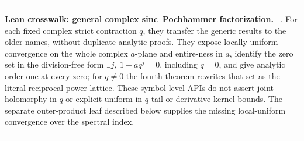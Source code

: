 \documentclass[11pt,oneside]{article}
\numberwithin{equation}{section}
\theoremstyle{definition}
\theoremstyle{remark}
\newenvironment{statusbox}[1]{%
  \par\medskip\noindent\begin{center}\begin{minipage}{0.94\textwidth}%
  \color{linkblue}\hrule\vspace{0.65em}%
  \color{black}\textbf{\color{linkblue}#1.}\ }{%
  \par\vspace{0.65em}\color{linkblue}\hrule
  \end{minipage}\end{center}\medskip}
\begin{document}
\begin{statusbox}{Lean crosswalk: general complex sinc--Pochhammer factorization}
.
For each fixed complex strict contraction $q$, they transfer the generic
 results to the older 
names, without duplicate analytic proofs.  They expose locally uniform
convergence on the whole complex $a$-plane and entire-ness in $a$, identify
the zero set in the division-free form
\(\exists j,\ 1-aq^j=0\), including \(q=0\), and give analytic order one at
every zero; for $q\ne0$ the fourth theorem rewrites that set as the literal
reciprocal-power lattice.  These symbol-level APIs do not assert joint
holomorphy in \(q\) or explicit uniform-in-\(q\) tail or derivative-kernel
bounds.  The separate outer-product leaf described below supplies the missing
local-uniform convergence over the spectral index.
\end{statusbox}
\end{document}
